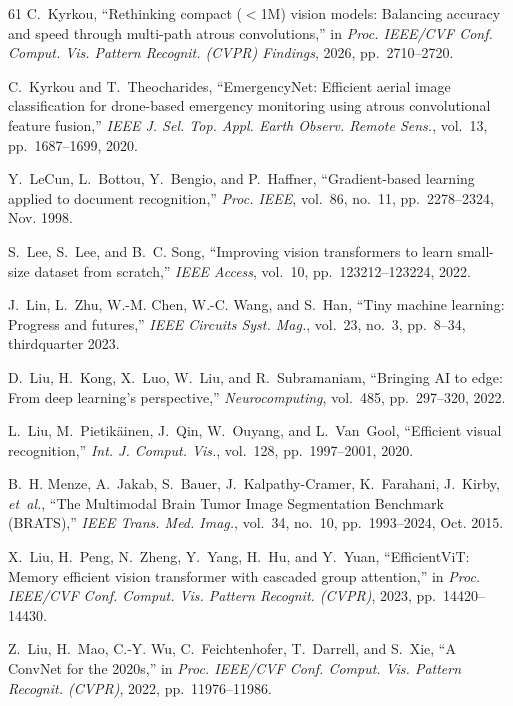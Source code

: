 \begin{thebibliography}{61}
C.~Kyrkou, ``Rethinking compact ($<$1M) vision models: Balancing accuracy and speed through multi-path atrous convolutions,'' in \emph{Proc. IEEE/CVF Conf. Comput. Vis. Pattern Recognit. (CVPR) Findings}, 2026, pp.~2710--2720.

C.~Kyrkou and T.~Theocharides, ``EmergencyNet: Efficient aerial image classification for drone-based emergency monitoring using atrous convolutional feature fusion,'' \emph{IEEE J. Sel. Top. Appl. Earth Observ. Remote Sens.}, vol.~13, pp.~1687--1699, 2020. 

Y.~LeCun, L.~Bottou, Y.~Bengio, and P.~Haffner, ``Gradient-based learning applied to document recognition,'' \emph{Proc. IEEE}, vol.~86, no.~11, pp.~2278--2324, Nov. 1998. 

S.~Lee, S.~Lee, and B.~C. Song, ``Improving vision transformers to learn small-size dataset from scratch,'' \emph{IEEE Access}, vol.~10, pp.~123212--123224, 2022. 

J.~Lin, L.~Zhu, W.-M. Chen, W.-C. Wang, and S.~Han, ``Tiny machine learning: Progress and futures,'' \emph{IEEE Circuits Syst. Mag.}, vol.~23, no.~3, pp.~8--34, thirdquarter 2023. 

D.~Liu, H.~Kong, X.~Luo, W.~Liu, and R.~Subramaniam, ``Bringing AI to edge: From deep learning's perspective,'' \emph{Neurocomputing}, vol.~485, pp.~297--320, 2022. 

L.~Liu, M.~Pietik{\"a}inen, J.~Qin, W.~Ouyang, and L.~Van~Gool, ``Efficient visual recognition,'' \emph{Int. J. Comput. Vis.}, vol.~128, pp.~1997--2001, 2020. 

B.~H. Menze, A.~Jakab, S.~Bauer, J.~Kalpathy-Cramer, K.~Farahani, J.~Kirby, \emph{et~al.}, ``The Multimodal Brain Tumor Image Segmentation Benchmark (BRATS),'' \emph{IEEE Trans. Med. Imag.}, vol.~34, no.~10, pp.~1993--2024, Oct. 2015. 

X.~Liu, H.~Peng, N.~Zheng, Y.~Yang, H.~Hu, and Y.~Yuan, ``EfficientViT: Memory efficient vision transformer with cascaded group attention,'' in \emph{Proc. IEEE/CVF Conf. Comput. Vis. Pattern Recognit. (CVPR)}, 2023, pp.~14420--14430.

Z.~Liu, H.~Mao, C.-Y. Wu, C.~Feichtenhofer, T.~Darrell, and S.~Xie, ``A ConvNet for the 2020s,'' in \emph{Proc. IEEE/CVF Conf. Comput. Vis. Pattern Recognit. (CVPR)}, 2022, pp.~11976--11986.


\end{thebibliography}

